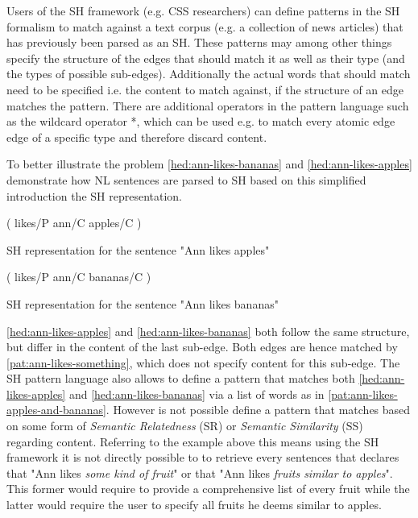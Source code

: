 \documentclass[11pt]{scrreprt}
\let\cite\parencite  %
\begin{document}
Users of the SH framework (e.g. CSS researchers) can define patterns in the SH formalism to match against a text corpus (e.g. a collection of news articles) that has previously been parsed as an SH. These patterns may among other things specify the structure of the edges that should match it as well as their type (and the types of possible sub-edges). Additionally the actual words that should match need to be specified i.e. the content to match against, if the structure of an edge matches the pattern. 
There are additional operators in the pattern language such as the wildcard operator \textsf{*}, which can be used e.g. to match every atomic edge edge of a specific type and therefore discard content.

To better illustrate the problem \cref{hed:ann-likes-bananas} and \cref{hed:ann-likes-apples} demonstrate how NL sentences are parsed to SH based on this simplified introduction the SH representation.

\begin{hedge}
  \normalfont\sffamily
  \centering
  ( likes/P ann/C apples/C ) 
  \caption{SH representation for the sentence "Ann likes apples"}
  \label{hed:ann-likes-apples}
\end{hedge}

\begin{hedge}
  \normalfont\sffamily
  \centering
  ( likes/P ann/C bananas/C ) 
  \caption{SH representation for the sentence "Ann likes bananas"}
  \label{hed:ann-likes-bananas}
\end{hedge}


\cref{hed:ann-likes-apples} and \cref{hed:ann-likes-bananas} both follow the same structure, but differ in the content of the last sub-edge. Both edges are hence matched by \cref{pat:ann-likes-something}, which does not specify content for this sub-edge.
The SH pattern language also allows to define a pattern that matches both \cref{hed:ann-likes-apples} and \cref{hed:ann-likes-bananas} via a list of words as in \cref{pat:ann-likes-apples-and-bananas}. However is not possible define a pattern that matches based on some form of \textit{Semantic Relatedness} (SR) or \textit{Semantic Similarity} (SS) \cite{harispeSemanticSimilarityNatural2015} regarding content.
Referring to the example above this means using the SH framework it is not directly possible to to retrieve every sentences that declares that "Ann likes \textit{some kind of fruit}" or that "Ann likes \textit{fruits similar to apples}". This former would require to provide a comprehensive list of every fruit while the latter would require the user to specify all fruits he deems similar to apples.
\end{document}
